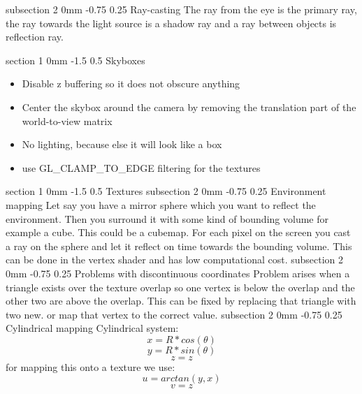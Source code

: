 \documentclass[a4paper,11pt]{article}
\makeatletter
\renewcommand{\section}{\@startsection
   {section}%
   {1}%
   {0mm}%
   {-1.5\baselineskip}%
   {0.5\baselineskip}%
   {\sffamily\bfseries\upshape\normalsize}}%
\renewcommand{\subsection}{\@startsection
   {subsection}%
   {2}%
   {0mm}%
   {-0.75\baselineskip}%
   {0.25\baselineskip}%
   {\rmfamily\normalfont\slshape\normalsize}}%
\makeatother
\begin{document}
\subsection{Ray-casting}
The ray from the eye is the primary ray, the ray towards the light source is a shadow ray and a ray between objects is reflection ray.

\section{Skyboxes}
\begin{itemize}
\item Disable z buffering so it does not obscure anything
\item Center the skybox around the camera by removing the translation part of the world-to-view matrix
\item No lighting, because else it will look like a box
\item use GL\_CLAMP\_TO\_EDGE filtering for the textures
\end{itemize}

\section{Textures}
\subsection{Environment mapping}
Let say you have a mirror sphere which you want to reflect the environment. Then you surround it with some kind of bounding volume for example a cube. This could be a cubemap. For each pixel on the screen you cast a ray on the sphere and let it reflect on time towards the bounding volume. This can be done in the vertex shader and has low computational cost. 
\subsection{Problems with discontinuous coordinates}
Problem arises when a triangle exists over the texture  overlap so one vertex is below the overlap and the other two are above the overlap. This can be fixed by replacing that triangle with two new. or map that vertex to the correct value.
\subsection{Cylindrical mapping}
Cylindrical system:
$$x=R*cos(\theta)$$
$$y=R*sin(\theta) $$
$$z=z$$
for mapping this onto a texture we use:
$$u=arctan(y,x)$$
$$v=z$$
\end{document}
